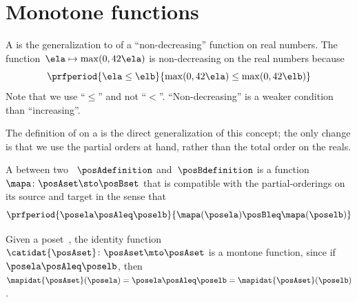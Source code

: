 
\section{Monotone functions}
\label{sec:monotonicity-monotone-maps}



A  is the generalization to  of a ``non-decreasing'' function on real numbers.
The function~$\ela \mapsto \max(0, 42 \ela)$ is non-decreasing on the real numbers because
\begin{equation}\label{eq:monotone-eq-1}
    \prfperiod{
        \ela \leq \elb
    }{
        \max(0, 42 \ela) \leq \max(0, 42 \elb)
    }
\end{equation}
Note that we use ``$\leq$'' and not ``$<$''.
``Non-decreasing'' is a weaker condition than ``increasing''.

The definition of  on a  is the direct generalization of this concept; the only change is that we use the partial orders at hand, rather than the total order on the reals.

\begin{definition}
    \label{def:monotone}
    A  between two ~$\posAdefinition$ and~$\posBdefinition$ is a function~$\mapa \colon \posAset \sto \posBset$ that is compatible with the partial-orderings on its source and target in the sense that
    \begin{equation}\label{eq:monotone-map-definition}
        \prfperiod{
            \posela \posAleq \poselb
        }{
            \mapa(\posela) \posBleq \mapa(\poselb)
        }
    \end{equation}
\end{definition}

\begin{example}
    Given a poset~\posA, the identity function~$\catidat{\posAset}\colon \posAset \mto\linebreak[0] \posAset$ is a montone function, since if~$\posela\posAleq \poselb$, then~$\mapidat{\posAset}(\posela)=\posela \posAleq \poselb = \mapidat{\posAset}(\poselb )$.
\end{example}


